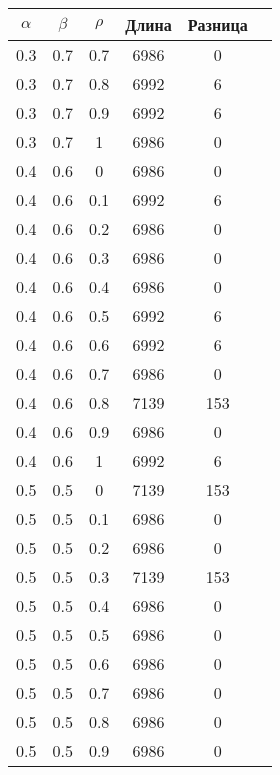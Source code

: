 \begin{table}
\begin{minipage}[!h]{0.50\hsize}
\begin{center}
{\begin{tabular}{|c@{\hspace{5mm}}|c@{\hspace{5mm}}|c@{\hspace{5mm}}|c@{\hspace{5mm}}|c@{\hspace{5mm}}|c|}
                    \hline
                    $\alpha$ & $\beta$ & $\rho$ & Длина & Разница \\
                    \hline
                    0.3  & 0.7  & 0.7  & 6986  & 0     \\
                    0.3  & 0.7  & 0.8  & 6992  & 6     \\
                    0.3  & 0.7  & 0.9  & 6992  & 6     \\
                    0.3  & 0.7  & 1    & 6986  & 0     \\
                    0.4  & 0.6  & 0    & 6986  & 0     \\
                    0.4  & 0.6  & 0.1  & 6992  & 6     \\
                    0.4  & 0.6  & 0.2  & 6986  & 0     \\
                    0.4  & 0.6  & 0.3  & 6986  & 0     \\
                    0.4  & 0.6  & 0.4  & 6986  & 0     \\
                    0.4  & 0.6  & 0.5  & 6992  & 6     \\
                    0.4  & 0.6  & 0.6  & 6992  & 6     \\
                    0.4  & 0.6  & 0.7  & 6986  & 0     \\
                    0.4  & 0.6  & 0.8  & 7139  & 153   \\
                    0.4  & 0.6  & 0.9  & 6986  & 0     \\
                    0.4  & 0.6  & 1    & 6992  & 6     \\
                    0.5  & 0.5  & 0    & 7139  & 153   \\
                    0.5  & 0.5  & 0.1  & 6986  & 0     \\
                    0.5  & 0.5  & 0.2  & 6986  & 0     \\
                    0.5  & 0.5  & 0.3  & 7139  & 153   \\
                    0.5  & 0.5  & 0.4  & 6986  & 0     \\
                    0.5  & 0.5  & 0.5  & 6986  & 0     \\
                    0.5  & 0.5  & 0.6  & 6986  & 0     \\
                    0.5  & 0.5  & 0.7  & 6986  & 0     \\
                    0.5  & 0.5  & 0.8  & 6986  & 0     \\
                    0.5  & 0.5  & 0.9  & 6986  & 0     \\

\end{tabular}}
\end{center}
\end{minipage}
\end{table}
